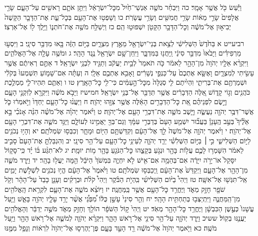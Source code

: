 \documentclass[twoside, openany, parskip=half, 11pt]{book}
\begin{document}
וַיַּ֕עַשׂ כֹּ֖ל אֲשֶׁ֥ר אָמָֽר׃ כה וַיִּבְחַ֨ר מֹשֶׁ֤ה אַנְשֵׁי־חַ֙יִל֙ מִכׇּל־יִשְׂרָאֵ֔ל וַיִּתֵּ֥ן אֹתָ֛ם רָאשִׁ֖ים עַל־הָעָ֑ם שָׂרֵ֤י אֲלָפִים֙ שָׂרֵ֣י מֵא֔וֹת שָׂרֵ֥י חֲמִשִּׁ֖ים וְשָׂרֵ֥י עֲשָׂרֹֽת׃ כו וְשָׁפְט֥וּ אֶת־הָעָ֖ם בְּכׇל־עֵ֑ת אֶת־הַדָּבָ֤ר הַקָּשֶׁה֙ יְבִיא֣וּן אֶל־מֹשֶׁ֔ה וְכׇל־הַדָּבָ֥ר הַקָּטֹ֖ן יִשְׁפּוּט֥וּ הֵֽם׃ כז וַיְשַׁלַּ֥ח מֹשֶׁ֖ה אֶת־חֹתְנ֑וֹ וַיֵּ֥לֶךְ ל֖וֹ אֶל־אַרְצֽוֹ׃

רביעייט א בַּחֹ֙דֶשׁ֙ הַשְּׁלִישִׁ֔י לְצֵ֥את בְּנֵי־יִשְׂרָאֵ֖ל מֵאֶ֣רֶץ מִצְרָ֑יִם בַּיּ֣וֹם הַזֶּ֔ה בָּ֖אוּ מִדְבַּ֥ר סִינָֽי׃ ב וַיִּסְע֣וּ מֵרְפִידִ֗ים וַיָּבֹ֙אוּ֙ מִדְבַּ֣ר סִינַ֔י וַֽיַּחֲנ֖וּ בַּמִּדְבָּ֑ר וַיִּֽחַן־שָׁ֥ם יִשְׂרָאֵ֖ל נֶ֥גֶד הָהָֽר׃ ג וּמֹשֶׁ֥ה עָלָ֖ה אֶל־הָאֱלֹהִ֑ים וַיִּקְרָ֨א אֵלָ֤יו יְהֹוָה֙ מִן־הָהָ֣ר לֵאמֹ֔ר כֹּ֤ה תֹאמַר֙ לְבֵ֣ית יַעֲקֹ֔ב וְתַגֵּ֖יד לִבְנֵ֥י יִשְׂרָאֵֽל׃ ד אַתֶּ֣ם רְאִיתֶ֔ם אֲשֶׁ֥ר עָשִׂ֖יתִי לְמִצְרָ֑יִם וָאֶשָּׂ֤א אֶתְכֶם֙ עַל־כַּנְפֵ֣י נְשָׁרִ֔ים וָאָבִ֥א אֶתְכֶ֖ם אֵלָֽי׃ ה וְעַתָּ֗ה אִם־שָׁמ֤וֹעַ תִּשְׁמְעוּ֙ בְּקֹלִ֔י וּשְׁמַרְתֶּ֖ם אֶת־בְּרִיתִ֑י וִהְיִ֨יתֶם לִ֤י סְגֻלָּה֙ מִכׇּל־הָ֣עַמִּ֔ים כִּי־לִ֖י כׇּל־הָאָֽרֶץ׃ טו ו וְאַתֶּ֧ם תִּהְיוּ־לִ֛י מַמְלֶ֥כֶת כֹּהֲנִ֖ים וְג֣וֹי קָד֑וֹשׁ אֵ֚לֶּה הַדְּבָרִ֔ים אֲשֶׁ֥ר תְּדַבֵּ֖ר אֶל־בְּנֵ֥י יִשְׂרָאֵֽל׃ חמישיז וַיָּבֹ֣א מֹשֶׁ֔ה וַיִּקְרָ֖א לְזִקְנֵ֣י הָעָ֑ם וַיָּ֣שֶׂם לִפְנֵיהֶ֗ם אֵ֚ת כׇּל־הַדְּבָרִ֣ים הָאֵ֔לֶּה אֲשֶׁ֥ר צִוָּ֖הוּ יְהֹוָֽה׃ ח וַיַּעֲנ֨וּ כׇל־הָעָ֤ם יַחְדָּו֙ וַיֹּ֣אמְר֔וּ כֹּ֛ל אֲשֶׁר־דִּבֶּ֥ר יְהֹוָ֖ה נַעֲשֶׂ֑ה וַיָּ֧שֶׁב מֹשֶׁ֛ה אֶת־דִּבְרֵ֥י הָעָ֖ם אֶל־יְהֹוָֽה׃ ט וַיֹּ֨אמֶר יְהֹוָ֜ה אֶל־מֹשֶׁ֗ה הִנֵּ֨ה אָנֹכִ֜י בָּ֣א אֵלֶ֘יךָ֮ בְּעַ֣ב הֶֽעָנָן֒ בַּעֲב֞וּר יִשְׁמַ֤ע הָעָם֙ בְּדַבְּרִ֣י עִמָּ֔ךְ וְגַם־בְּךָ֖ יַאֲמִ֣ינוּ לְעוֹלָ֑ם וַיַּגֵּ֥ד מֹשֶׁ֛ה אֶת־דִּבְרֵ֥י הָעָ֖ם אֶל־יְהֹוָֽה׃ י וַיֹּ֨אמֶר יְהֹוָ֤ה אֶל־מֹשֶׁה֙ לֵ֣ךְ אֶל־הָעָ֔ם וְקִדַּשְׁתָּ֥ם הַיּ֖וֹם וּמָחָ֑ר וְכִבְּס֖וּ שִׂמְלֹתָֽם׃ יא וְהָי֥וּ נְכֹנִ֖ים לַיּ֣וֹם הַשְּׁלִישִׁ֑י כִּ֣י ׀ בַּיּ֣וֹם הַשְּׁלִשִׁ֗י יֵרֵ֧ד יְהֹוָ֛ה לְעֵינֵ֥י כׇל־הָעָ֖ם עַל־הַ֥ר סִינָֽי׃ יב וְהִגְבַּלְתָּ֤ אֶת־הָעָם֙ סָבִ֣יב לֵאמֹ֔ר הִשָּׁמְר֥וּ לָכֶ֛ם עֲל֥וֹת בָּהָ֖ר וּנְגֹ֣עַ בְּקָצֵ֑הוּ כׇּל־הַנֹּגֵ֥עַ בָּהָ֖ר מ֥וֹת יוּמָֽת׃ יג לֹא־תִגַּ֨ע בּ֜וֹ יָ֗ד כִּֽי־סָק֤וֹל יִסָּקֵל֙ אוֹ־יָרֹ֣ה יִיָּרֶ֔ה אִם־בְּהֵמָ֥ה אִם־אִ֖ישׁ לֹ֣א יִחְיֶ֑ה בִּמְשֹׁךְ֙ הַיֹּבֵ֔ל הֵ֖מָּה יַעֲל֥וּ בָהָֽר׃ יד וַיֵּ֧רֶד מֹשֶׁ֛ה מִן־הָהָ֖ר אֶל־הָעָ֑ם וַיְקַדֵּשׁ֙ אֶת־הָעָ֔ם וַֽיְכַבְּס֖וּ שִׂמְלֹתָֽם׃ טו וַיֹּ֙אמֶר֙ אֶל־הָעָ֔ם הֱי֥וּ נְכֹנִ֖ים לִשְׁלֹ֣שֶׁת יָמִ֑ים אַֽל־תִּגְּשׁ֖וּ אֶל־אִשָּֽׁה׃ טז וַיְהִי֩ בַיּ֨וֹם הַשְּׁלִישִׁ֜י בִּֽהְיֹ֣ת הַבֹּ֗קֶר וַיְהִי֩ קֹלֹ֨ת וּבְרָקִ֜ים וְעָנָ֤ן כָּבֵד֙ עַל־הָהָ֔ר וְקֹ֥ל שֹׁפָ֖ר חָזָ֣ק מְאֹ֑ד וַיֶּחֱרַ֥ד כׇּל־הָעָ֖ם אֲשֶׁ֥ר בַּֽמַּחֲנֶֽה׃ יז וַיּוֹצֵ֨א מֹשֶׁ֧ה אֶת־הָעָ֛ם לִקְרַ֥את הָֽאֱלֹהִ֖ים מִן־הַֽמַּחֲנֶ֑ה וַיִּֽתְיַצְּב֖וּ בְּתַחְתִּ֥ית הָהָֽר׃ יח וְהַ֤ר סִינַי֙ עָשַׁ֣ן כֻּלּ֔וֹ מִ֠פְּנֵ֠י אֲשֶׁ֨ר יָרַ֥ד עָלָ֛יו יְהֹוָ֖ה בָּאֵ֑שׁ וַיַּ֤עַל עֲשָׁנוֹ֙ כְּעֶ֣שֶׁן הַכִּבְשָׁ֔ן וַיֶּחֱרַ֥ד כׇּל־הָהָ֖ר מְאֹֽד׃ יט וַיְהִי֙ ק֣וֹל הַשֹּׁפָ֔ר הוֹלֵ֖ךְ וְחָזֵ֣ק מְאֹ֑ד מֹשֶׁ֣ה יְדַבֵּ֔ר וְהָאֱלֹהִ֖ים יַעֲנֶ֥נּוּ בְקֽוֹל׃ ששיכ וַיֵּ֧רֶד יְהֹוָ֛ה עַל־הַ֥ר סִינַ֖י אֶל־רֹ֣אשׁ הָהָ֑ר וַיִּקְרָ֨א יְהֹוָ֧ה לְמֹשֶׁ֛ה אֶל־רֹ֥אשׁ הָהָ֖ר וַיַּ֥עַל מֹשֶֽׁה׃ כא וַיֹּ֤אמֶר יְהֹוָה֙ אֶל־מֹשֶׁ֔ה רֵ֖ד הָעֵ֣ד בָּעָ֑ם פֶּן־יֶהֶרְס֤וּ אֶל־יְהֹוָה֙ לִרְא֔וֹת וְנָפַ֥ל מִמֶּ֖נּוּ 
\end{document}
